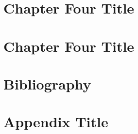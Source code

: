 \documentclass[12pt]{report}
\begin{document}
\chapter{Chapter Four Title}


\chapter{Chapter Four Title}


\chapter*{Bibliography}
\printbibliography

\appendix
\chapter{Appendix Title}
%
\end{document}
